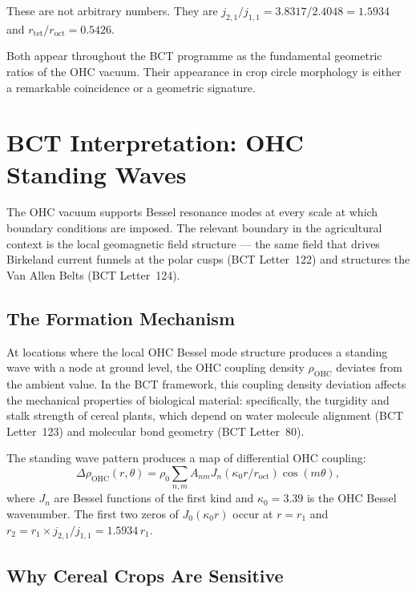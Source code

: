 \documentclass[aps,prl,twocolumn,superscriptaddress,floatfix]{revtex4-2}
\begin{document}
These are not arbitrary numbers. They are
$j_{2,1}/j_{1,1} = 3.8317/2.4048 = 1.5934$ and
$r_\mathrm{tet}/r_\mathrm{oct} = 0.5426$.

Both appear throughout the BCT programme as the fundamental geometric
ratios of the OHC vacuum. Their appearance in crop circle morphology
is either a remarkable coincidence or a geometric signature.

\section{BCT Interpretation: OHC Standing Waves}

The OHC vacuum supports Bessel resonance modes at every scale at
which boundary conditions are imposed. The relevant boundary in the
agricultural context is the local geomagnetic field structure ---
the same field that drives Birkeland current funnels at the polar
cusps (BCT Letter~122) and structures the Van Allen Belts
(BCT Letter~124).

\subsection{The Formation Mechanism}

At locations where the local OHC Bessel mode structure produces a
standing wave with a node at ground level, the OHC coupling density
$\rho_\mathrm{OHC}$ deviates from the ambient value. In the BCT
framework, this coupling density deviation affects the mechanical
properties of biological material: specifically, the turgidity and
stalk strength of cereal plants, which depend on water molecule
alignment (BCT Letter~123) and molecular bond geometry (BCT
Letter~80).

The standing wave pattern produces a map of differential OHC
coupling:
\begin{equation}
\Delta\rho_\mathrm{OHC}(r,\theta)
= \rho_0 \sum_{n,m} A_{nm}
J_n(\kappa_0 r / r_\mathrm{oct}) \cos(m\theta),
\label{eq:oHCmap}
\end{equation}
where $J_n$ are Bessel functions of the first kind and $\kappa_0 =
3.39$ is the OHC Bessel wavenumber. The first two zeros of
$J_0(\kappa_0 r)$ occur at $r = r_1$ and $r_2 = r_1 \times
j_{2,1}/j_{1,1} = 1.5934\, r_1$.

\subsection{Why Cereal Crops Are Sensitive}
\end{document}
